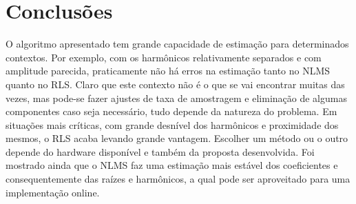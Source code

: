 \section{Conclusões}
O algoritmo apresentado tem grande capacidade de estimação para determinados contextos. Por exemplo, com os harmônicos relativamente separados e com amplitude parecida, praticamente não há erros na estimação tanto no NLMS quanto no RLS. Claro que este contexto não é o que se vai encontrar muitas das vezes, mas pode-se fazer ajustes de taxa de amostragem e eliminação de algumas componentes caso seja necessário, tudo depende da natureza do problema. Em situações mais críticas, com grande desnível dos harmônicos e proximidade dos mesmos, o RLS acaba levando grande vantagem. Escolher um método ou o outro depende do hardware disponível e também da proposta desenvolvida. Foi mostrado ainda que o NLMS faz uma estimação mais estável dos coeficientes e consequentemente das raízes e harmônicos, a qual pode ser aproveitado para uma implementação online.
